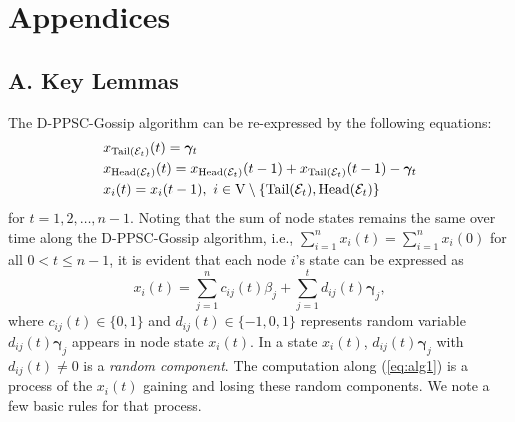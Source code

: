 \documentclass[a4paper, 11pt]{article}
\newcommand{\1}{\mathbf{1}}
\newcommand{\asf}{\mathcal{E}}
\newcommand{\Head}{\textnormal{Head}}
\newcommand{\Tail}{\textnormal{Tail}}
\newcommand{\mV}{\mathrm{V}}
\newcommand{\gammab}{{\bm \gamma}}
\begin{document}
\medskip

\section*{Appendices}

\medskip

\subsection*{A. Key Lemmas}
The D-PPSC-Gossip algorithm can be re-expressed by the following equations:
\begin{equation}\label{eq:alg1}
\begin{aligned}
& x_{\Tail(\asf_{t})}(t) = \gammab_{t}\\
& x_{\Head(\asf_{t})}(t) = x_{\Head(\asf_{t})}(t-1) + x_{\Tail(\asf_{t})}(t-1) - \gammab_t\\
& x_{i}(t) = x_{i}(t-1),\ i\in\mV\setminus\{\Tail(\asf_{t}),\Head(\asf_{t})\}
\end{aligned}
\end{equation}
for $t=1,2,\dots,n-1 $. 
Noting that the sum of node states remains  the same over time along the D-PPSC-Gossip algorithm, i.e., $\sum\limits_{i=1}^n x_{i}(t)=\sum\limits_{i=1}^n x_{i}(0)$ for all $0< t\le n-1 $, it is evident that each node $i$'s state can be expressed as
\begin{equation}\label{eq:c_d_def}
x_{i}(t) = \sum\limits_{j=1}^n c_{ij}(t)\beta_j + \sum\limits_{j=1}^{t}d_{ij}(t)\gammab_j,
\end{equation}
where $c_{ij}(t)\in\{0,1\}$ and $d_{ij}(t)\in\{-1,0,1\}$ represents random variable $d_{ij}(t)\gammab_j$ appears in node state $x_i(t)$. In a state $x_i(t)$, $d_{ij}(t)\gammab_j$ with $d_{ij}(t)\neq0$ is a \emph{random component}.
The computation along (\ref{eq:alg1}) is a process of the $x_i(t)$ gaining and losing these random components.
We note a few basic rules for that process.
\end{document}
